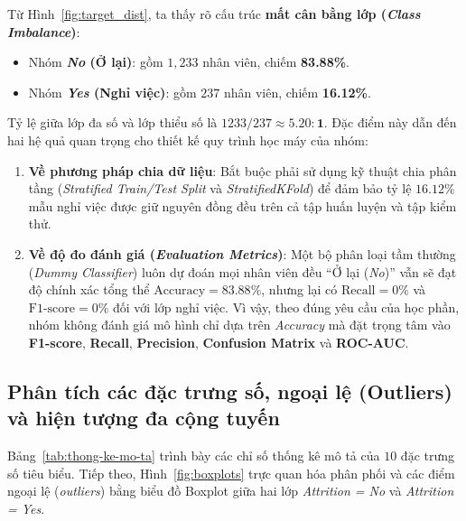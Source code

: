 Từ Hình~\ref{fig:target_dist}, ta thấy rõ cấu trúc \textbf{mất cân bằng lớp (\textit{Class Imbalance})}:
\begin{itemize}
    \item Nhóm \textbf{\textit{No} (Ở lại)}: gồm $1,233$ nhân viên, chiếm \textbf{83.88\%}.
    \item Nhóm \textbf{\textit{Yes} (Nghỉ việc)}: gồm $237$ nhân viên, chiếm \textbf{16.12\%}.
\end{itemize}
Tỷ lệ giữa lớp đa số và lớp thiểu số là $1233 / 237 \approx \mathbf{5.20 : 1}$. Đặc điểm này dẫn đến hai hệ quả quan trọng cho thiết kế quy trình học máy của nhóm:
\begin{enumerate}
    \item \textbf{Về phương pháp chia dữ liệu}: Bắt buộc phải sử dụng kỹ thuật chia phân tầng (\textit{Stratified Train/Test Split} và \textit{StratifiedKFold}) để đảm bảo tỷ lệ $16.12\%$ mẫu nghỉ việc được giữ nguyên đồng đều trên cả tập huấn luyện và tập kiểm thử.
    \item \textbf{Về độ đo đánh giá (\textit{Evaluation Metrics})}: Một bộ phân loại tầm thường (\textit{Dummy Classifier}) luôn dự đoán mọi nhân viên đều ``Ở lại (\textit{No})'' vẫn sẽ đạt độ chính xác tổng thể $\text{Accuracy} = 83.88\%$, nhưng lại có $\text{Recall} = 0\%$ và $\text{F1-score} = 0\%$ đối với lớp nghỉ việc. Vì vậy, theo đúng yêu cầu của học phần, nhóm không đánh giá mô hình chỉ dựa trên \textit{Accuracy} mà đặt trọng tâm vào \textbf{F1-score}, \textbf{Recall}, \textbf{Precision}, \textbf{Confusion Matrix} và \textbf{ROC-AUC}.
\end{enumerate}

\subsection{Phân tích các đặc trưng số, ngoại lệ (Outliers) và hiện tượng đa cộng tuyến}
Bảng~\ref{tab:thong-ke-mo-ta} trình bày các chỉ số thống kê mô tả của $10$ đặc trưng số tiêu biểu. Tiếp theo, Hình~\ref{fig:boxplots} trực quan hóa phân phối và các điểm ngoại lệ (\textit{outliers}) bằng biểu đồ Boxplot giữa hai lớp \textit{Attrition = No} và \textit{Attrition = Yes}.

